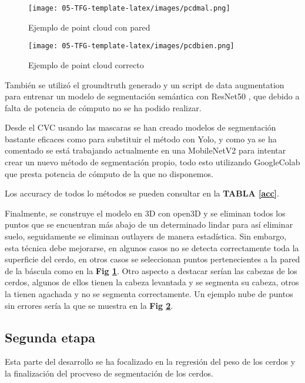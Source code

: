 \documentclass[12pt,a4paper]{article}
\begin{document}
\begin{figure}[!]
\centering
\texttt{[image: 05-TFG-template-latex/images/pcdmal.png]}
\caption{Ejemplo de point cloud con pared}
\label{pcdmal}
\end{figure}

\begin{figure}[!]
\centering
\texttt{[image: 05-TFG-template-latex/images/pcdbien.png]}
\caption{Ejemplo de point cloud correcto}
\label{pcdbien}
\end{figure}

También se utilizó el groundtruth generado y un script de data augmentation para entrenar un modelo de segmentación semántica con ResNet50 \cite{resnet}, que debido a falta de potencia de cómputo no se ha podido realizar.

Desde el CVC usando las mascaras se han creado modelos de segmentación bastante eficaces como para substituir el método con Yolo, y como ya se ha comentado se está trabajando actualmente en una MobileNetV2 para intentar crear un nuevo método de segmentación propio, todo esto utilizando GoogleColab que presta potencia de cómputo de la que no disponemos.


Los accuracy de todos lo métodos se pueden consultar en la \textbf{TABLA \ref{acc}}.


Finalmente, se construye el modelo en 3D con open3D \cite{open3D} y se eliminan todos los puntos que se encuentran más abajo de un determinado lindar para así eliminar suelo, seguidamente se eliminan outlayers de manera estadística. Sin embargo, esta técnica debe mejorarse, en algunos casos no se detecta correctamente toda la superficie del cerdo, en otros casos se seleccionan puntos pertenecientes a la pared de la báscula como en la \textbf{Fig \ref{pcdmal}}. Otro aspecto a destacar serían las cabezas de los cerdos, algunos de ellos tienen la cabeza levantada y se segmenta su cabeza, otros la tienen agachada y no se segmenta correctamente. Un ejemplo nube de puntos sin errores sería la que se muestra en la \textbf{Fig \ref{pcdbien}}.








\subsection{Segunda etapa}
Esta parte del desarrollo se ha focalizado en la regresión del peso de los cerdos y la finalización del procveso de segmentación de los cerdos.
\end{document}
